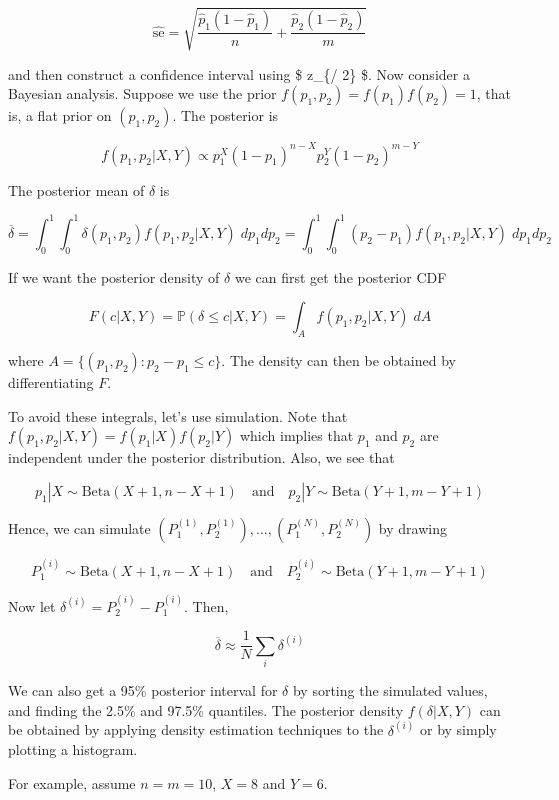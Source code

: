 \[ \hat{\text{se}} = \sqrt{\frac{\hat{p}_1 (1 - \hat{p}_1)}{n} + \frac{\hat{p}_2 (1 - \hat{p}_2)}{m}} \]

and then construct a confidence interval using \$\hat{\delta}
\pm z\_\{\alpha / 2\}  \$. Now consider a Bayesian
analysis. Suppose we use the prior \(f(p_1, p_2) = f(p_1) f(p_2) = 1\),
that is, a flat prior on \((p_1, p_2)\). The posterior is

\[ f(p_1, p_2 | X, Y) \propto p_1^{X} (1 - p_1)^{n - X} p_2^Y (1 - p_2)^{m - Y}\]

The posterior mean of \(\delta\) is

\[ \overline{\delta} = \int_0^1 \int_0^1 \delta(p_1, p_2) f(p_1, p_2 | X, Y) \; dp_1 dp_2 = \int_0^1 \int_0^1 (p_2 - p_1) f(p_1, p_2 | X, Y) \; dp_1 dp_2 \]

If we want the posterior density of \(\delta\) we can first get the
posterior CDF

\[ F(c | X, Y) = \mathbb{P}(\delta \leq c | X, Y) = \int_A f(p_1, p_2 | X, Y) \; dA \]

where \(A = \{ (p_1, p_2) : p_2 - p_1 \leq c \}\). The density can then
be obtained by differentiating \(F\).

To avoid these integrals, let's use simulation. Note that
\(f(p_1, p_2 | X, Y) = f(p_1 | X) f(p_2 | Y)\) which implies that
\(p_1\) and \(p_2\) are independent under the posterior distribution.
Also, we see that

\[ 
p_1 | X \sim \text{Beta}(X + 1, n - X + 1) 
\quad \text{and} \quad
p_2 | Y \sim \text{Beta}(Y + 1, m - Y + 1) 
\]

Hence, we can simulate
\((P_1^{(1)}, P_2^{(1)}), \dots, (P_1^{(N)}, P_2^{(N)})\) by drawing

\[ 
P_1^{(i)} \sim \text{Beta}(X + 1, n - X + 1) 
\quad \text{and} \quad
P_2^{(i)} \sim \text{Beta}(Y + 1, m - Y + 1) 
\]

Now let \(\delta^{(i)} = P_2^{(i)} - P_1^{(i)}\). Then,

\[ \overline{\delta} \approx \frac{1}{N} \sum_i \delta^{(i)} \]

We can also get a 95\% posterior interval for \(\delta\) by sorting the
simulated values, and finding the 2.5\% and 97.5\% quantiles. The
posterior density \(f(\delta | X, Y)\) can be obtained by applying
density estimation techniques to the \(\delta^{(i)}\) or by simply
plotting a histogram.

For example, assume \(n = m = 10\), \(X = 8\) and \(Y = 6\).

